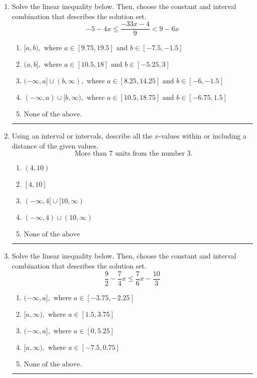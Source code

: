\documentclass[14pt]{extbook}
\newcommand{\litem}[1]{\item#1\hspace*{-1cm}\rule{\textwidth}{0.4pt}}
\begin{document}
\begin{enumerate}
{\begin{enumerate}[label=\Alph*.]
\end{enumerate} }
\litem{
Solve the linear inequality below. Then, choose the constant and interval combination that describes the solution set.\[ -5 - 4 x \leq \frac{-33 x - 4}{9} < 9 - 6 x \]\begin{enumerate}[label=\Alph*.]
\item \( [a, b), \text{ where } a \in [9.75, 19.5] \text{ and } b \in [-7.5, -1.5] \)
\item \( (a, b], \text{ where } a \in [10.5, 18] \text{ and } b \in [-5.25, 3] \)
\item \( (-\infty, a] \cup (b, \infty), \text{ where } a \in [8.25, 14.25] \text{ and } b \in [-6, -1.5] \)
\item \( (-\infty, a) \cup [b, \infty), \text{ where } a \in [10.5, 18.75] \text{ and } b \in [-6.75, 1.5] \)
\item \( \text{None of the above.} \)

\end{enumerate} }
\litem{
Using an interval or intervals, describe all the $x$-values within or including a distance of the given values.\[ \text{ More than } 7 \text{ units from the number } 3. \]\begin{enumerate}[label=\Alph*.]
\item \( (4, 10) \)
\item \( [4, 10] \)
\item \( (-\infty, 4] \cup [10, \infty) \)
\item \( (-\infty, 4) \cup (10, \infty) \)
\item \( \text{None of the above} \)

\end{enumerate} }
\litem{
Solve the linear inequality below. Then, choose the constant and interval combination that describes the solution set.\[ \frac{9}{2} - \frac{7}{4} x \leq \frac{7}{6} x - \frac{10}{3} \]\begin{enumerate}[label=\Alph*.]
\item \( (-\infty, a], \text{ where } a \in [-3.75, -2.25] \)
\item \( [a, \infty), \text{ where } a \in [1.5, 3.75] \)
\item \( (-\infty, a], \text{ where } a \in [0, 5.25] \)
\item \( [a, \infty), \text{ where } a \in [-7.5, 0.75] \)
\item \( \text{None of the above}. \)


\end{enumerate}}
\end{enumerate}
\end{document}
